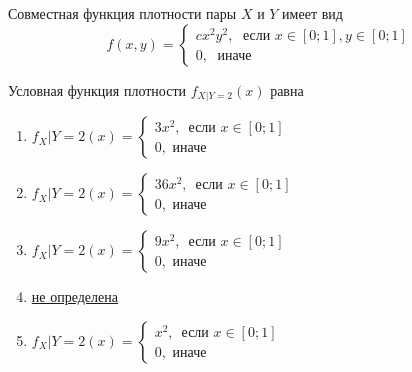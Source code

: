\documentclass[t]{beamer}
\begin{document}
 \begin{frame} \label{22} 
\begin{block}{22} 

Совместная функция плотности пары $X$ и $Y$ имеет вид
\[
f(x,y)=\begin{cases}
cx^2y^2, \; \text{ если } x\in[0;1], y\in [0;1] \\
0, \; \text{ иначе}
\end{cases}
\]
 
Условная функция плотности  $f_{X|Y=2}(x)$ равна

 \end{block} 

\begin{enumerate} 
\item[] \hyperlink{22-No}{\beamergotobutton{} $f_X|Y=2(x)=\begin{cases} 3x^2,\, \text{ если }  x\in [0;1] \\ 0, \text{ иначе}     \end{cases}$}
\item[] \hyperlink{22-No}{\beamergotobutton{} $f_X|Y=2(x)=\begin{cases} 36x^2,\, \text{ если }  x\in [0;1] \\ 0, \text{ иначе}     \end{cases}$}
\item[] \hyperlink{22-No}{\beamergotobutton{} $f_X|Y=2(x)=\begin{cases} 9x^2,\, \text{ если }  x\in [0;1] \\ 0, \text{ иначе}     \end{cases}$}
\item[] \hyperlink{22-Yes}{\beamergotobutton{} не определена}
\item[] \hyperlink{22-No}{\beamergotobutton{} $f_X|Y=2(x)=\begin{cases} x^2,\, \text{ если }  x\in [0;1] \\ 0, \text{ иначе}     \end{cases}$}
\end{enumerate} 
\end{frame} 
\end{document}
